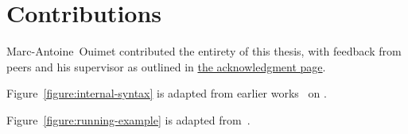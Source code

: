 \chapter*{Contributions}

Marc-Antoine~Ouimet contributed the entirety of this thesis, with feedback from peers and his supervisor as outlined in \hyperref[chapter:acknowledgments]{the acknowledgment page}.

Figure~\ref{figure:internal-syntax} is adapted from earlier works~\cite{nanevski2008contextual, germain2010implementation, cave2013first, ferreira2013compiling} on \Beluga.

Figure~\ref{figure:running-example} is adapted from~\cite{felty2010reasoning}.
